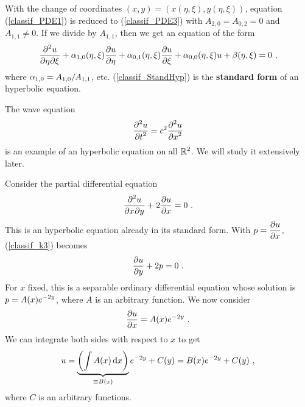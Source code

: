 With the change of coordinates $(x,y)=(x(\eta,\xi),y(\eta,\xi))$,
equation (\ref{classif_PDE1}) is reduced to
(\ref{classif_PDE3}) with $A_{2,0} = A_{0,2} = 0$ and $A_{1,1} \neq 0$.
If we divide by $A_{1,1}$, then we get an equation of the form
\begin{equation} \label{classif_StandHyp}
\pdydxnm{u}{\eta}{\xi}{2}{}{}
+ \alpha_{1,0}(\eta,\xi) \pdydx{u}{\eta}
+ \alpha_{0,1}(\eta,\xi) \pdydx{u}{\xi} + \alpha_{0,0}(\eta,\xi)u +
\beta (\eta,\xi) = 0 \  , 
\end{equation}
where $\DS \alpha_{1,0} = A_{1,0}/A_{1,1}$, etc.
(\ref{classif_StandHyp}) is the
{\bfseries standard form} of an hyperbolic equation.

\begin{egg}
The wave equation
\[
\pdydxn{u}{t}{2} = c^2 \pdydxn{u}{x}{2}
\]
is an example of an hyperbolic equation on all $\DS \RR^2$.
We will study it extensively later.
\end{egg}

\begin{egg}
Consider the partial differential equation
\begin{equation}\label{classif_k3}
\pdydxnm{u}{x}{y}{2}{}{} + 2 \pdydx{u}{x} = 0 \ .
\end{equation}
This is an hyperbolic equation already in its standard form.  With
$\DS p = \pdydx{u}{x}$, (\ref{classif_k3}) becomes
\[
\pdydx{u}{y} + 2 p = 0 \ .
\]
For $x$ fixed, this is a separable ordinary differential equation
whose solution is $\DS p = A(x) e^{-2y}$, where $A$ is an
arbitrary function.  We now consider
\[
\pdydx{u}{x} = A(x) e^{-2y} \ .
\]
We can integrate both sides with respect to $x$ to get
\[
u = \underbrace{\left(\int A(x) \dx{x}\right)}_{\equiv B(x)} e^{-2y} + C(y)
= B(x) e^{-2y} +C(y) \ ,
\]
where $C$ is an arbitrary functions.
\end{egg}


